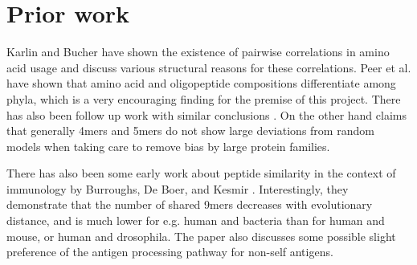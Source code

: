 \documentclass[superscriptaddress,onecolumn,pre]{revtex4}
\newcommand{\<}{\langle}
\renewcommand{\>}{\rangle}
\begin{document}
\section{Prior work}

Karlin and Bucher \cite{Karlin1992} have shown the existence of pairwise correlations in amino acid usage and discuss various structural reasons for these correlations. Peer et al. \cite{Peer2004} have shown that amino acid and oligopeptide compositions differentiate among phyla, which is a very encouraging finding for the premise of this project. There has also been follow up work with similar conclusions \cite{Bogatyreva2006}. On the other hand \cite{Lavelle2009} claims that generally 4mers and 5mers do not show large deviations from random models when taking care to remove bias by large protein families.

There has also been some early work about peptide similarity in the context of immunology by Burroughs, De Boer, and Kesmir \cite{Burroughs2004}. Interestingly, they demonstrate that the number of shared 9mers decreases with evolutionary distance, and is much lower for e.g. human and bacteria than for human and mouse, or human and drosophila. The paper also discusses some possible slight preference of the antigen processing pathway for non-self antigens.


\end{document}
